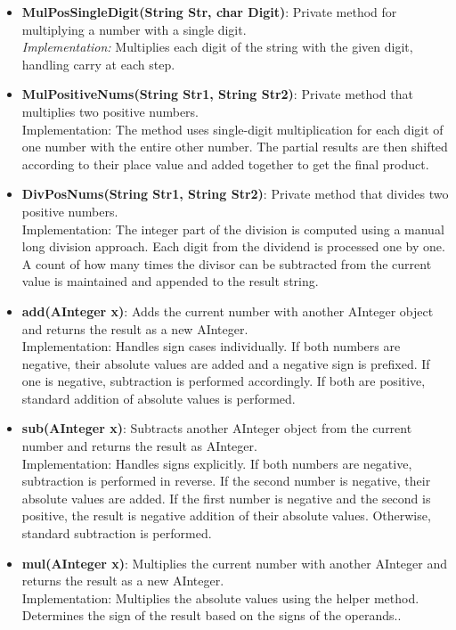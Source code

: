 \documentclass{article}
\begin{document}
\begin{itemize}
    \item \textbf{MulPosSingleDigit(String Str, char Digit)}: Private method for multiplying a number with a single digit. \\
    \textit{Implementation:} Multiplies each digit of the string with the given digit, handling carry at each step.

    \item \textbf{MulPositiveNums(String Str1, String Str2)}: Private method that multiplies two positive numbers. \\
    Implementation: The method uses single-digit multiplication for each digit of one number with the entire other number. The partial results are then shifted according to their place value and added together to get the final product.

    \item \textbf{DivPosNums(String Str1, String Str2)}: Private method that divides two positive numbers. \\
    Implementation: The integer part of the division is computed using a manual long division approach. Each digit from the dividend is processed one by one. A count of how many times the divisor can be subtracted from the current value is maintained and appended to the result string.

    \item \textbf{add(AInteger x)}: Adds the current number with another AInteger object and returns the result as a new AInteger. \\
    Implementation: Handles sign cases individually. If both numbers are negative, their absolute values are added and a negative sign is prefixed. If one is negative, subtraction is performed accordingly. If both are positive, standard addition of absolute values is performed.

    \item \textbf{sub(AInteger x)}: Subtracts another AInteger object from the current number and returns the result as AInteger. \\
    Implementation: Handles signs explicitly. If both numbers are negative, subtraction is performed in reverse. If the second number is negative, their absolute values are added. If the first number is negative and the second is positive, the result is negative addition of their absolute values. Otherwise, standard subtraction is performed.

    \item \textbf{mul(AInteger x)}: Multiplies the current number with another AInteger and returns the result as a new AInteger. \\
    Implementation: Multiplies the absolute values using the helper method. Determines the sign of the result based on the signs of the operands..


\end{itemize}
\end{document}

